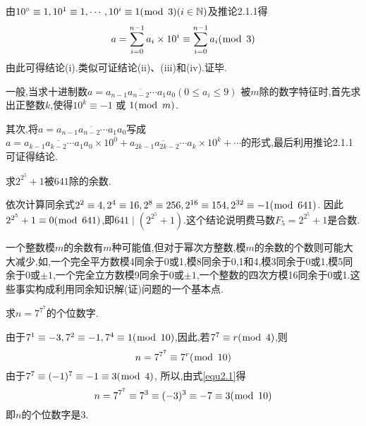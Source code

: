 \proof 由$10^{\circ} \equiv 1,10^{1} \equiv 1, \cdots, 10^{i} \equiv 1(\bmod \hspace{1ex}3)(i \in \mathbb{N})$及推论2.1.1得
\begin{equation*}
	a=\sum_{i=0}^{n-1} a_{i} \times 10^{i} \equiv \sum_{i=0}^{n-1} a_{i}(\bmod \hspace{1ex}3)
\end{equation*}
由此可得结论(i).类似可证结论(ii)、(iii)和(iv).证毕.

\remark 一般,当求十进制数$a=\overline{a_{n-1} a_{n-2} \cdots a_{1} a_{0}}\left(0 \leqslant a_{i} \leqslant 9\right)$ 被$m$除的数字特征时,首先求出正整数$k$,使得$10^{k} \equiv-1$ 或 $1(\bmod \hspace{1ex}m)$.

其次,将$a=\overline{a_{n-1} a_{n-2} \cdots a_{1} a_{0}}$写成$a=\overline{a_{k-1} a_{k-2} \cdots a_{1} a_{0}} \times 10^{0}+\overline{a_{2 k-1} a_{2 k-2} \cdots a_{k}} \times 10^{k}+\cdots$的形式,最后利用推论2.1.1可证得结论.

\example 求$2^{2^{5}}+1$被$641$除的余数.

\solve 依次计算同余式$2^{2} \equiv 4,2^{4} \equiv 16,2^{8} \equiv 256,2^{16} \equiv 154,2^{32} \equiv-1(\bmod \hspace{1ex}641)$. 因此$2^{2^{5}}+1 \equiv 0(\bmod \hspace{1ex}641)$,即$641 \mid\left(2^{2^{5}}+1\right)$.这个结论说明费马数$F_{5}=2^{2^{5}}+1$是合数.

\remark 一个整数模$m$的余数有$m$种可能值,但对于幂次方整数,模$m$的余数的个数则可能大大减少,如,一个完全平方数模4同余于0或1,模8同余于0,1和4,模3同余于0或1,模5同余于0或$\pm 1$,一个完全立方数模9同余于0或$\pm 1$,一个整数的四次方模16同余于0或1.这些事实构成利用同余知识解(证)问题的一个基本点.

\example 求$n=7^{7^{7}}$的个位数字.

\solve 由于$7^{1} \equiv-3,7^{2} \equiv-1,7^{4} \equiv 1(\bmod \hspace{1ex}10)$,因此,若$7^{7} \equiv r(\bmod \hspace{1ex}4)$,则
\begin{equation}\label{equ2.1}
	n=7^{7^{7}} \equiv 7^{r}(\bmod \hspace{1ex}10)
\end{equation}
由于$7^{7} \equiv(-1)^{7} \equiv-1 \equiv 3(\bmod \hspace{1ex}4)$, 所以,由式\eqref{equ2.1}得
\begin{equation*}
	n=7^{7^{7}} \equiv 7^{3} \equiv(-3)^{3} \equiv-7 \equiv 3(\bmod \hspace{1ex}10)
\end{equation*}
即$n$的个位数字是$3$.

